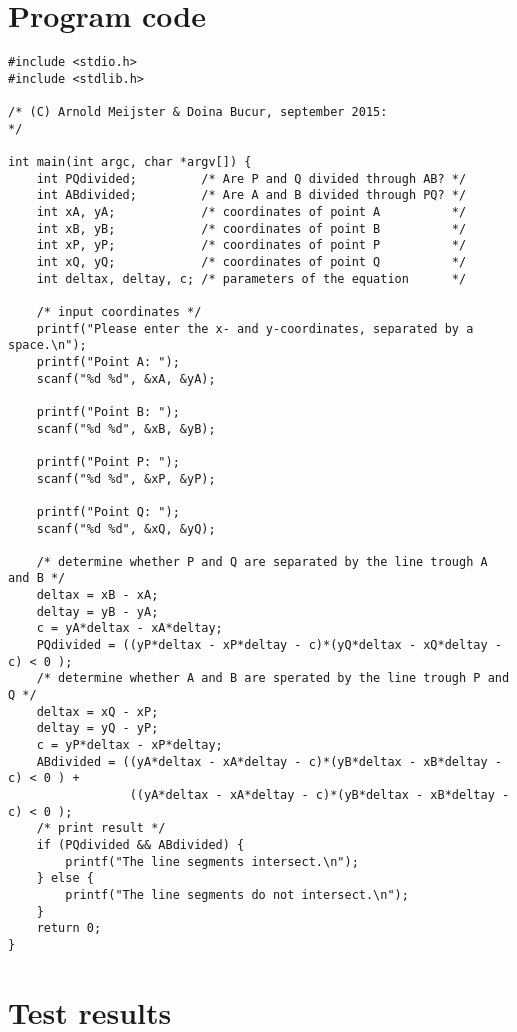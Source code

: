 \documentclass[a4paper,10pt]{article}
\begin{document}
\section{Program code}
\begin{lstlisting}[style = code, title = intersect.c]
#include <stdio.h>
#include <stdlib.h>

/* (C) Arnold Meijster & Doina Bucur, september 2015:
*/

int main(int argc, char *argv[]) {
    int PQdivided;         /* Are P and Q divided through AB? */
    int ABdivided;         /* Are A and B divided through PQ? */
    int xA, yA;            /* coordinates of point A          */
    int xB, yB;            /* coordinates of point B          */
    int xP, yP;            /* coordinates of point P          */
    int xQ, yQ;            /* coordinates of point Q          */
    int deltax, deltay, c; /* parameters of the equation      */

    /* input coordinates */
    printf("Please enter the x- and y-coordinates, separated by a space.\n");
    printf("Point A: ");
    scanf("%d %d", &xA, &yA);

    printf("Point B: ");
    scanf("%d %d", &xB, &yB);

    printf("Point P: ");
    scanf("%d %d", &xP, &yP);

    printf("Point Q: ");
    scanf("%d %d", &xQ, &yQ);

    /* determine whether P and Q are separated by the line trough A and B */
    deltax = xB - xA;
    deltay = yB - yA;
    c = yA*deltax - xA*deltay;
    PQdivided = ((yP*deltax - xP*deltay - c)*(yQ*deltax - xQ*deltay - c) < 0 );
    /* determine whether A and B are sperated by the line trough P and Q */
    deltax = xQ - xP;
    deltay = yQ - yP;
    c = yP*deltax - xP*deltay;
    ABdivided = ((yA*deltax - xA*deltay - c)*(yB*deltax - xB*deltay - c) < 0 ) + 
                 ((yA*deltax - xA*deltay - c)*(yB*deltax - xB*deltay - c) < 0 );
    /* print result */
    if (PQdivided && ABdivided) {
        printf("The line segments intersect.\n");
    } else {
        printf("The line segments do not intersect.\n");
    }
    return 0;
}
\end{lstlisting}

\section{Test results}
\end{document}
